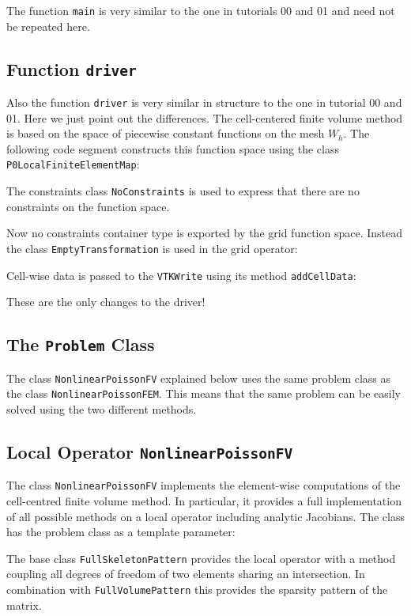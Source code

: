 \documentclass[a4paper,12pt]{article}
\begin{document}
The function \lstinline{main} is very similar to the one in tutorials 00 and 01
and need not be repeated here.

\subsection{Function \lstinline{driver}}

Also the function \lstinline{driver} is very similar in structure to the 
one in tutorial 00 and 01. Here we just point out the differences.
The cell-centered finite volume method is based on the space of piecewise
constant functions on the mesh $W_h$. The following code segment
constructs this function space using the class \lstinline{P0LocalFiniteElementMap}:

The constraints class \lstinline{NoConstraints} is used to express that
there are no constraints on the function space.

Now no constraints container type is exported by the grid function space.
Instead the class \lstinline{EmptyTransformation} is used in the grid operator:


Cell-wise data is passed to the \lstinline{VTKWrite}
using its method \lstinline{addCellData}:

These are the only changes to the driver!

\subsection{The \lstinline{Problem} Class}

The class \lstinline{NonlinearPoissonFV} explained below uses
the same problem class as the class \lstinline{NonlinearPoissonFEM}. This means
that the same problem can be easily solved using the two different methods.

\subsection{Local Operator \lstinline{NonlinearPoissonFV}}

The class \lstinline{NonlinearPoissonFV} implements the
element-wise computations of the cell-centred finite volume
method. In particular, it provides a full implementation
of all possible methods on a local operator including
analytic Jacobians. The class has the problem class as a template parameter:

The base class \lstinline{FullSkeletonPattern} provides the local operator
with a method coupling all degrees of freedom of two elements sharing an intersection.
In combination with \lstinline{FullVolumePattern} this provides the sparsity pattern
of the matrix.
\end{document}
